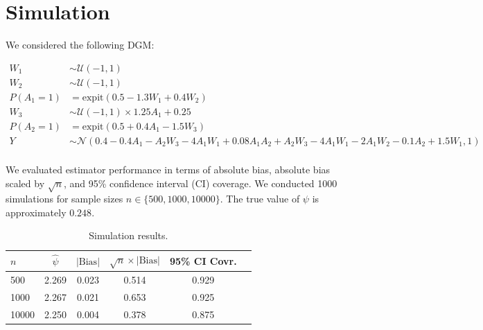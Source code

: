 \section{Simulation}

We considered the following DGM: 

{\footnotesize
  \begin{align*}
    W_1 &\sim \mathcal{U}(-1, 1) \\
    W_2 &\sim \mathcal{U}(-1, 1) \\
    P(A_1 = 1) &= \text{expit}(0.5 - 1.3W_1 + 0.4W_2) \\
    W_3 &\sim \mathcal{U}(-1, 1) \times 1.25A_1 + 0.25\\
    P(A_2 = 1) &= \text{expit}(0.5 + 0.4A_1 - 1.5W_3) \\
    Y &\sim \mathcal{N}(0.4 - 0.4A_1 - A_2W_3 - 4A_1W_1 + 0.08A_1A_2 + A_2W_3 - 4A_1W_1 - 2A_1W_2 - 0.1A_2 + 1.5W_1, 1) \\
  \end{align*}
 }

We evaluated estimator performance in terms of absolute bias, absolute bias scaled by $\sqrt{n}$, and 95\% confidence interval (CI) coverage. We conducted 1000 simulations for sample sizes $n \in \{500, 1000, 10000\}$. The true value of $\psi$ is approximately $0.248$.

\begin{table}[H]
\centering
\footnotesize
\caption{Simulation results.}
\begin{tabular}[t]{lccccc}
\toprule
$n$ & $\hat{\psi}$ & $|\text{Bias}|$ & $\sqrt{n} \times |\text{Bias}|$ & 95\% CI Covr. \\
\midrule
500 & 2.269 & 0.023   & 0.514 & 0.929   \\
1000 & 2.267 & 0.021  & 0.653 & 0.925  \\
10000 & 2.250 & 0.004 & 0.378 & 0.875 \\
\bottomrule
\end{tabular}
\end{table}

